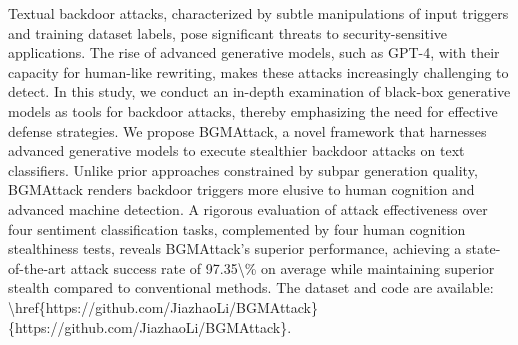 Textual backdoor attacks, characterized by subtle manipulations of input triggers and training dataset labels, pose significant threats to security-sensitive applications. The rise of advanced generative models, such as GPT-4, with their capacity for human-like rewriting, makes these attacks increasingly challenging to detect. In this study, we conduct an in-depth examination of black-box generative models as tools for backdoor attacks, thereby emphasizing the need for effective defense strategies. We propose BGMAttack, a novel framework that harnesses advanced generative models to execute stealthier backdoor attacks on text classifiers. Unlike prior approaches constrained by subpar generation quality, BGMAttack renders backdoor triggers more elusive to human cognition and advanced machine detection. A rigorous evaluation of attack effectiveness over four sentiment classification tasks, complemented by four human cognition stealthiness tests, reveals BGMAttack’s superior performance, achieving a state-of-the-art attack success rate of 97.35\textbackslash{}\% on average while maintaining superior stealth compared to conventional methods. The dataset and code are available: \textbackslash{}href\{https://github.com/JiazhaoLi/BGMAttack\}\{https://github.com/JiazhaoLi/BGMAttack\}.